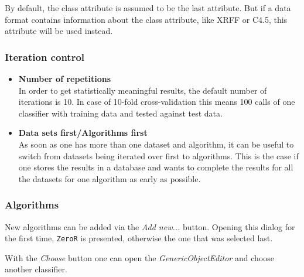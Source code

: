 By default, the class attribute is assumed to be the last attribute. But if a data format contains information about the class attribute, like XRFF or C4.5, this attribute will be used instead.

\begin{center}
\end{center}


\subsubsection{Iteration control}

\begin{itemize}
   \item \textbf{Number of repetitions} \\
      In order to get statistically meaningful results, the default number of iterations is 10. In case of 10-fold cross-validation this means 100 calls of one classifier with training data and tested against test data. 

   \item \textbf{Data sets first/Algorithms first} \\
      As soon as one has more than one dataset and algorithm, it can be useful to switch from datasets being iterated over first to algorithms. This is the case if one stores the results in a database and wants to complete the results for all the datasets for one algorithm as early as possible. 
\end{itemize}


\subsubsection{Algorithms}

New algorithms can be added via the \textit{Add new...} button. Opening this dialog for the first time, \texttt{ZeroR} is presented, otherwise the one that was selected last.

\begin{center}
\end{center}


With the \textit{Choose} button one can open the \textit{GenericObjectEditor} and choose another classifier.

\begin{center}
\end{center}

